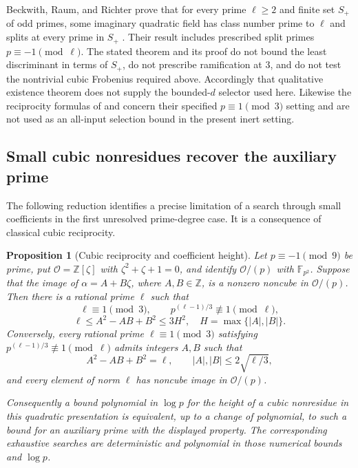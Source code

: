 \documentclass[11pt]{article}
\newtheorem{proposition}[theorem]{Proposition}
\theoremstyle{definition}
\theoremstyle{remark}
\begin{document}
Beckwith, Raum, and Richter prove that for every prime
$\ell\ge2$ and finite set $S_+$ of odd primes, some
imaginary quadratic field has class number prime to
$\ell$ and splits at every prime in $S_+$
\cite[Theorem~A]{BeckwithRaumRichter2024}.
Their result includes prescribed split primes
$p\equiv-1\pmod\ell$.  The stated theorem and its
proof do not bound the least discriminant in terms of
$S_+$, do not prescribe ramification at $3$, and do not
test the nontrivial cubic Frobenius required above.
Accordingly that qualitative existence theorem does not
supply the bounded-$d$ selector used here.
Likewise the reciprocity formulas of
\cite[Theorem~1.6]{EvansEtAl2025Hasse} and
\cite[Theorem~1.1]{EvansVanVeen2026Cubic} concern their
specified $p\equiv1\pmod3$ setting and are not used as
an all-input selection bound in the present inert setting.

\subsection{Small cubic nonresidues recover the auxiliary prime}
\label{subsec:cubic-small-candidates}

The following reduction identifies a precise limitation of a search
through small coefficients in the first unresolved prime-degree case.
It is a consequence of classical cubic reciprocity.

\begin{proposition}[Cubic reciprocity and coefficient height]
\label{prop:cubic-height-prime}
Let $p\equiv-1\pmod 9$ be prime, put
$\mathcal O=\mathbb Z[\zeta]$ with $\zeta^2+\zeta+1=0$, and identify
$\mathcal O/(p)$ with $\mathbb F_{p^2}$.
Suppose that the image of $\alpha=A+B\zeta$, where $A,B\in\mathbb Z$,
is a nonzero noncube in $\mathcal O/(p)$.
Then there is a rational prime $\ell$ such that
\[
 \ell\equiv1\pmod3,\qquad
 p^{(\ell-1)/3}\not\equiv1\pmod\ell,
\]
\[
 \ell\le A^2-AB+B^2\le3H^2,
 \quad H=\max\{|A|,|B|\}.
\]
Conversely, every rational prime $\ell\equiv1\pmod3$ satisfying
$p^{(\ell-1)/3}\not\equiv1\pmod\ell$ admits integers $A,B$ such that
\[
 A^2-AB+B^2=\ell,\qquad
 |A|,|B|\le2\sqrt{\ell/3},
\]
and every element of norm $\ell$ has noncube image in
$\mathcal O/(p)$.

Consequently a bound polynomial in $\log p$ for the height of a
cubic nonresidue in this quadratic presentation is equivalent, up to
a change of polynomial, to such a bound for an auxiliary prime
with the displayed property. The corresponding exhaustive searches
are deterministic and polynomial in those numerical bounds and
$\log p$.
\end{proposition}
\end{document}
